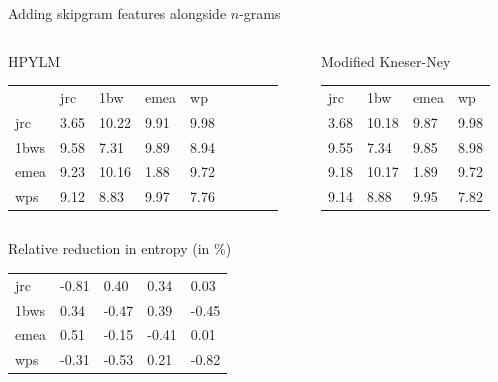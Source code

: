 \begin{frame}{Adding skipgram features alongside $n$-grams}

\begin{columns}[b]
            \begin{column}[b]{0.45\textwidth}
                \begin{block}{HPYLM}
                \begin{tabular}{lllllllll}
                         & jrc  & 1bw   & emea & wp   \\
                    jrc  & 3.65 & 10.22 & 9.91 & 9.98 \\
                    1bws & 9.58 & 7.31  & 9.89 & 8.94 \\
                    emea & 9.23 & 10.16 & 1.88 & 9.72 \\
                    wps  & 9.12 & 8.83  & 9.97 & 7.76 \\
                \end{tabular}
                \end{block}
                \vspace{0pt}
            \end{column}
            \quad
            \begin{column}[b]{0.45\textwidth}
                \begin{block}{Modified Kneser-Ney}
                \begin{tabular}{llll}
                    jrc  & 1bw   & emea & wp   \\
                    3.68 & 10.18 & 9.87 & 9.98 \\
                    9.55 & 7.34  & 9.85 & 8.98 \\
                    9.18 & 10.17 & 1.89 & 9.72 \\
                    9.14 & 8.88  & 9.95 & 7.82 \\
                \end{tabular}
                \end{block}
                \vspace{0pt}
            \end{column}            
        \end{columns}
 
        \begin{columns}[b]
            \begin{column}[b]{0.45\textwidth}
                \begin{block}{Relative reduction in entropy (in \%)}
                \begin{tabular}{lllll}
                    jrc  & -0.81 & 0.40  & 0.34  & 0.03  \\
                    1bws & 0.34  & -0.47 & 0.39  & -0.45 \\
                    emea & 0.51  & -0.15 & -0.41 & 0.01  \\
                    wps  & -0.31 & -0.53 & 0.21  & -0.82 \\
                \end{tabular}
                

\end{block}
\end{column}
\end{columns}
\end{frame}
